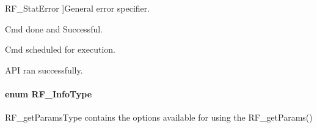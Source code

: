 \begin{Desc}
\begin{description}
{R\+F\+\_\+\+Stat\+Error\label{_r_f_8h_afdc219ddabc8427ecd552a6c78d9988fac071b8de44aabb8e2354432ce1146b86}
}]General error specifier. \item[{\em 
R\+F\+\_\+\+Stat\+Cmd\+Done\+Success\label{_r_f_8h_afdc219ddabc8427ecd552a6c78d9988faa110d04edae5a85a12906d729f97de87}
}]Cmd done and Successful. \item[{\em 
R\+F\+\_\+\+Stat\+Cmd\+Sch\label{_r_f_8h_afdc219ddabc8427ecd552a6c78d9988fabf33d4930fd89cd5ca80220da258d31c}
}]Cmd scheduled for execution. \item[{\em 
R\+F\+\_\+\+Stat\+Success\label{_r_f_8h_afdc219ddabc8427ecd552a6c78d9988faa98bd78e437864464cdb2aca1d3e024d}
}]A\+P\+I ran successfully. \end{description}
\end{Desc}
\paragraph[{R\+F\+\_\+\+Info\+Type}]{\setlength{\rightskip}{0pt plus 5cm}enum {\bf R\+F\+\_\+\+Info\+Type}}\label{_r_f_8h_a22596109459422a7a4d4f386dffbb8fa}


R\+F\+\_\+get\+Params\+Type contains the options available for using the R\+F\+\_\+get\+Params() 

